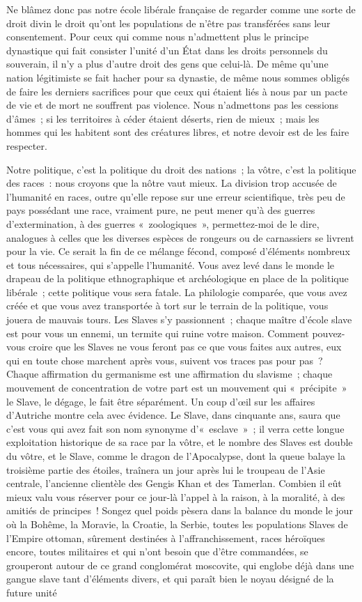\documentclass[french,twoside]{book} %
\begin{document}
Ne blâmez donc pas notre école libérale française de regarder comme une sorte de droit divin le droit qu’ont les populations de n’être pas transférées sans leur consentement. Pour ceux qui comme nous n’admettent plus le principe dynastique qui fait consister l’unité d’un État dans les droits personnels du souverain, il n’y a plus d’autre droit des gens que celui-là. De même qu’une nation légitimiste se fait hacher pour sa dynastie, de même nous sommes obligés de faire les derniers sacrifices pour que ceux qui étaient liés à nous par un pacte de vie et de mort ne souffrent pas violence. Nous n’admettons pas les cessions d’âmes ; si les territoires à céder étaient déserts, rien de mieux ; mais les hommes qui les habitent sont des créatures libres, et notre devoir est de les faire respecter.\par
Notre politique, c’est la politique du droit des nations ; la vôtre, c’est la politique des races : nous croyons que la nôtre vaut mieux. La division trop accusée de l’humanité en races, outre qu’elle repose sur une erreur scientifique, très peu de pays possédant une race, vraiment pure, ne peut mener qu’à des guerres d’extermination, à des guerres « zoologiques », permettez-moi de le dire, analogues à celles que les diverses espèces de rongeurs ou de carnassiers se livrent pour la vie. Ce serait la fin de ce mélange fécond, composé d’éléments nombreux et tous nécessaires, qui s’appelle l’humanité. Vous avez levé dans le monde le drapeau de la politique ethnographique et archéologique en place de la politique libérale ; cette politique vous sera fatale. La philologie comparée, que vous avez créée et que vous avez transportée à tort sur le terrain de la politique, vous jouera de mauvais tours. Les Slaves s’y passionnent ; chaque maître d’école slave est pour vous un ennemi, un termite qui ruine votre maison. Comment pouvez-vous croire que les Slaves ne vous feront pas ce que vous faites aux autres, eux qui en toute chose marchent après vous, suivent vos traces pas pour pas ? Chaque affirmation du germanisme est une affirmation du slavisme ; chaque mouvement de concentration de votre part est un mouvement qui « précipite » le Slave, le dégage, le fait être séparément. Un coup d’œil sur les affaires d’Autriche montre cela avec évidence. Le Slave, dans cinquante ans, saura que c’est vous qui avez fait son nom synonyme d’« esclave » ; il verra cette longue exploitation historique de sa race par la vôtre, et le nombre des Slaves est double du vôtre, et le Slave, comme le dragon de l’Apocalypse, dont la queue balaye la troisième partie des étoiles, traînera un jour après lui le troupeau de l’Asie centrale, l’ancienne clientèle des Gengis Khan et des Tamerlan. Combien il eût mieux valu vous réserver pour ce jour-là l’appel à la raison, à la moralité, à des amitiés de principes ! Songez quel poids pèsera dans la balance du monde le jour où la Bohême, la Moravie, la Croatie, la Serbie, toutes les populations Slaves de l’Empire ottoman, sûrement destinées à l’affranchissement, races héroïques encore, toutes militaires et qui n’ont besoin que d’être commandées, se grouperont autour de ce grand conglomérat moscovite, qui englobe déjà dans une gangue slave tant d’éléments divers, et qui paraît bien le noyau désigné de la future unité 
\end{document}
